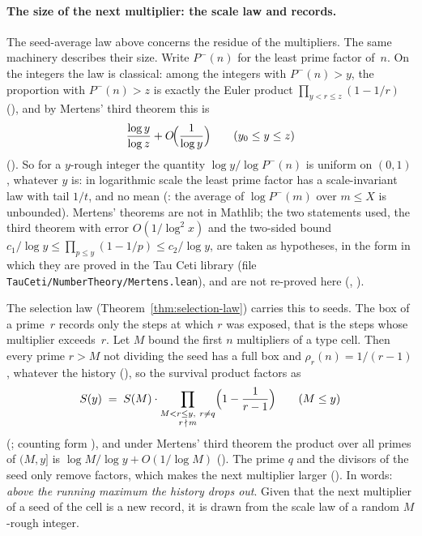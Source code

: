 \paragraph{The size of the next multiplier: the scale law and records.}
\label{sec:scale-law}
The seed-average law above concerns the residue of the multipliers.  The
same machinery describes their size.  Write $P^-(n)$ for the least prime
factor of~$n$.  On the integers the law is classical: among the integers
with $P^-(n)>y$, the proportion with $P^-(n)>z$ is exactly the Euler
product $\prod_{y<r\le z}(1-1/r)$
(), and by
Mertens' third theorem this is
\[
  \frac{\log y}{\log z} + O\!\Bigl(\frac{1}{\log y}\Bigr)
  \qquad (y_0 \le y \le z)
\]
().  So for a $y$-rough
integer the quantity $\log y/\log P^-(n)$ is uniform on $(0,1)$, whatever
$y$ is: in logarithmic scale the least prime factor has a scale-invariant
law with tail $1/t$, and no mean
(: the
average of $\log P^-(m)$ over $m\le X$ is unbounded).  Mertens' theorems
are not in Mathlib; the two statements used, the third theorem with error
$O(1/\log^2 x)$ and the two-sided bound
$c_1/\log y\le\prod_{p\le y}(1-1/p)\le c_2/\log y$, are taken as
hypotheses, in the form in which they are proved in the Tau Ceti library
(file \texttt{TauCeti/NumberTheory/Mertens.lean}), and are not re-proved
here (,
).

The selection law (Theorem~\ref{thm:selection-law}) carries this to seeds.
The box of a prime~$r$ records only the steps at which $r$ was exposed,
that is the steps whose multiplier exceeds~$r$.  Let $M$ bound the first
$n$ multipliers of a type cell.  Then every prime $r>M$ not dividing the
seed has a full box and $\rho_r(n)=1/(r-1)$, whatever the history
(), so the survival
product factors as
\[
  S(y) \;=\; S(M)\cdot
  \prod_{\substack{M<r\le y,\ r\ne q\\ r\,\nmid\, m}}
     \Bigl(1-\frac{1}{r-1}\Bigr)
  \qquad (M \le y)
\]
(; counting form
), and under
Mertens' third theorem the product over all primes of $(M,y]$ is
$\log M/\log y+O(1/\log M)$
().  The prime $q$
and the divisors of the seed only remove factors, which makes the next
multiplier larger
().  In words:
\emph{above the running maximum the history drops out}.  Given that the
next multiplier of a seed of the cell is a new record, it is drawn from
the scale law of a random $M$-rough integer.


